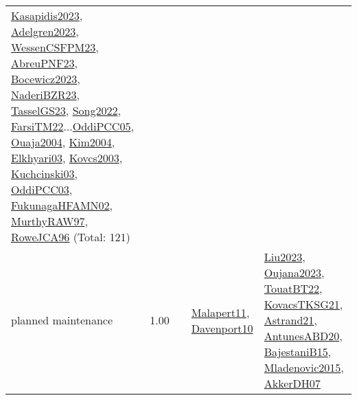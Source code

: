 {\begin{longtable}{p{3cm}r>{\raggedright\arraybackslash}p{6cm}>{\raggedright\arraybackslash}p{6cm}>{\raggedright\arraybackslash}p{8cm}}
\hyperref[detail:Kasapidis2023]{Kasapidis2023}, \hyperref[detail:Adelgren2023]{Adelgren2023}, \hyperref[detail:WessenCSFPM23]{WessenCSFPM23}, \hyperref[detail:AbreuPNF23]{AbreuPNF23}, \hyperref[detail:Bocewicz2023]{Bocewicz2023}, \hyperref[detail:NaderiBZR23]{NaderiBZR23}, \hyperref[detail:TasselGS23]{TasselGS23}, \hyperref[detail:Song2022]{Song2022}, \hyperref[detail:FarsiTM22]{FarsiTM22}...\hyperref[detail:OddiPCC05]{OddiPCC05}, \hyperref[detail:Ouaja2004]{Ouaja2004}, \hyperref[detail:Kim2004]{Kim2004}, \hyperref[detail:Elkhyari03]{Elkhyari03}, \hyperref[detail:Kovcs2003]{Kovcs2003}, \hyperref[detail:Kuchcinski03]{Kuchcinski03}, \hyperref[detail:OddiPCC03]{OddiPCC03}, \hyperref[detail:FukunagaHFAMN02]{FukunagaHFAMN02}, \hyperref[detail:MurthyRAW97]{MurthyRAW97}, \hyperref[detail:RoweJCA96]{RoweJCA96} (Total: 121)\\
\index{planned maintenance}\index{Concepts!planned maintenance}planned maintenance &  1.00 &  & \hyperref[detail:Malapert11]{Malapert11}, \hyperref[detail:Davenport10]{Davenport10} & \hyperref[detail:Liu2023]{Liu2023}, \hyperref[detail:Oujana2023]{Oujana2023}, \hyperref[detail:TouatBT22]{TouatBT22}, \hyperref[detail:KovacsTKSG21]{KovacsTKSG21}, \hyperref[detail:Astrand21]{Astrand21}, \hyperref[detail:AntunesABD20]{AntunesABD20}, \hyperref[detail:BajestaniB15]{BajestaniB15}, \hyperref[detail:Mladenovic2015]{Mladenovic2015}, \hyperref[detail:AkkerDH07]{AkkerDH07}\\

\end{longtable}}

